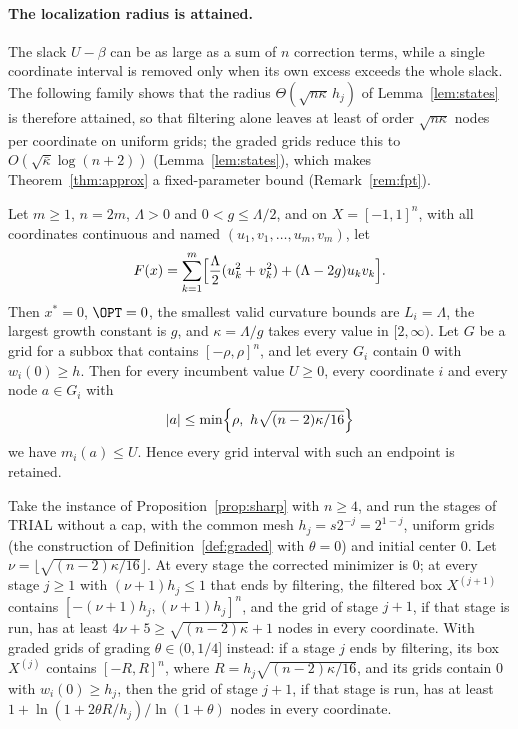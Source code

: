
\paragraph{The localization radius is attained.}
The slack $U-\beta$ can be as large as a sum of $n$ correction terms,
while a single coordinate interval is removed only when its own excess
exceeds the whole slack. The following family shows that the radius
$\Theta(\sqrt{n\kappa}\,h_j)$ of Lemma~\ref{lem:states} is therefore
attained, so that filtering alone leaves at least of order $\sqrt{n\kappa}$
nodes per coordinate on uniform grids; the graded grids reduce this to
$O(\sqrt{\bar\kappa}\log(n+2))$ (Lemma~\ref{lem:states}), which makes
Theorem~\ref{thm:approx} a fixed-parameter bound (Remark~\ref{rem:fpt}).

\begin{proposition}\label{prop:sharp}
Let $m\ge1$, $n=2m$, $\Lambda>0$ and $0<g\le\Lambda/2$, and on
$X=[-1,1]^n$, with all coordinates continuous and named
$(u_1,v_1,\dots,u_m,v_m)$, let
\[
F(x)=\sum_{k=1}^m\Bigl[\frac\Lambda2(u_k^2+v_k^2)+(\Lambda-2g)u_kv_k\Bigr].
\]
Then $x^*=0$, $\OPT=0$, the smallest valid curvature bounds are
$L_i=\Lambda$, the largest growth constant is $g$, and $\kappa=\Lambda/g$
takes every value in $[2,\infty)$. Let $G$ be a grid for a subbox that
contains $[-\rho,\rho]^n$, and let every $G_i$ contain $0$ with
$w_i(0)\ge h$. Then for every incumbent value $U\ge0$, every coordinate $i$
and every node $a\in G_i$ with
\[
|a|\le\min\Bigl\{\rho,\ h\sqrt{(n-2)\kappa/16}\Bigr\}
\]
we have $m_i(a)\le U$. Hence every grid interval with such an endpoint is
retained.
\end{proposition}

\begin{corollary}
\label{cor:uniformgrid}
Take the instance of Proposition~\ref{prop:sharp} with $n\ge4$, and run the
stages of TRIAL without a cap, with the common mesh $h_j=s2^{-j}=2^{1-j}$,
uniform grids (the construction of Definition~\ref{def:graded} with
$\theta=0$) and initial center $0$. Let
$\nu=\lfloor\sqrt{(n-2)\kappa/16}\rfloor$. At every stage the corrected
minimizer is $0$; at every stage $j\ge1$ with $(\nu+1)h_j\le1$ that ends by
filtering, the filtered box $X^{(j+1)}$ contains
$[-(\nu+1)h_j,(\nu+1)h_j]^n$, and the grid of stage $j+1$, if that stage is
run, has at least $4\nu+5\ge\sqrt{(n-2)\kappa}+1$ nodes in every coordinate.
With graded grids of grading $\theta\in(0,1/4]$ instead: if a stage $j$ ends
by filtering, its box $X^{(j)}$ contains $[-R,R]^n$, where
$R=h_j\sqrt{(n-2)\kappa/16}$, and its grids contain $0$ with
$w_i(0)\ge h_j$, then the grid of stage $j+1$, if that stage is run, has at
least $1+\ln(1+2\theta R/h_j)/\ln(1+\theta)$ nodes in every coordinate.
\end{corollary}

